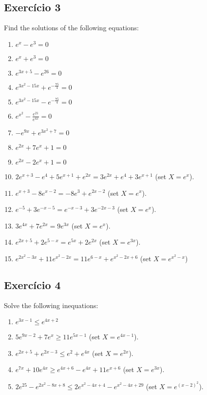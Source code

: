 \subsection*{Exercício 3}

Find the solutions of the following equations:

\begin{enumerate}
\item $e^{x} - e^3 = 0$
\item $e^{x} + e^3 = 0$
\item $e^{3x+5} - e^{26} = 0$
\item $e^{3x^2 - 15x} + e^{-\frac{75}{4}} = 0$
\item $e^{3x^2 - 15x} - e^{-\frac{75}{4}} = 0$
\item $e^{x^2} - \frac{e^{21}}{e^{4x}} = 0$
\item $-e^{9x} + e^{3x^2+7}= 0$
\item $e^{2x} + 7 e^x + 1 = 0$
\item $e^{2x} - 2 e^x + 1 = 0$
\item $2 e^{x+3} - e^4 + 5e^{x+1} + e^{2x} = 3e^{2x} + e^4 + 3e^{x+1}$
  (set $X = e^x$).
\item $e^{x+3} - 8 e^{x-2} = -8 e^3 + e^{2x-2}$ (set $X = e^x$).
\item $e^{-5} + 3e^{-x-5} = e^{-x-3} + 3e^{-2x-3}$ (set $X = e^x$).
\item $3e^{4x} + 7e^{2x} = 9 e^{3x}$ (set $X = e^x$).
\item $e^{2x+5} + 2e^{5-x} = e^{5x} + 2e^{2x}$ (set $X = e^{3x}$).
\item $e^{2x^2 - 3x} + 11e^{x^2 - 2x} = 11 e^{6-x} + e^{x^2 - 2x + 6}$
  (set $X = e^{x^2-x}$)
\end{enumerate}

\subsection*{Exercício 4}

Solve the following inequations:

\begin{enumerate}
\item $e^{3x-1} \leq e^{4x+2}$
\item $5e^{9x-2} + 7e^x \geq 11e^{5x-1}$ (set $X = e^{4x-1}$).
\item $e^{2x+5} + e^{2x-3} \leq e^2 + e^{4x}$ (set $X = e^{2x}$).
\item $e^{7x} + 10e^{4x} \geq e^{4x+6} - e^{4x} + 11 e^{x+6}$ (set $X = e^{3x}$).
\item $2e^{25} - e^{2x^2 -8x+8}
  \leq  2e^{x^2-4x+4} -  e^{x^2-4x+29}$ (set $X = e^{{(x-2)}^2}$).
\end{enumerate}

